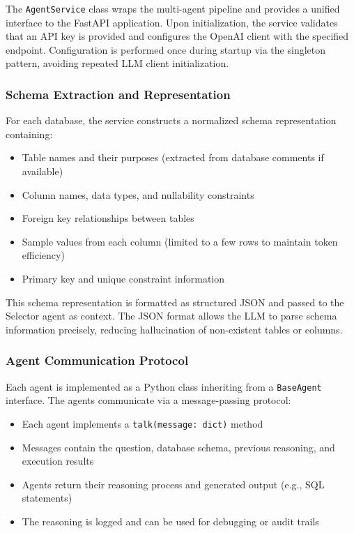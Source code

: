 The \texttt{AgentService} class wraps the multi-agent pipeline and provides a unified interface to the FastAPI application. Upon initialization, the service validates that an API key is provided and configures the OpenAI client with the specified endpoint. Configuration is performed once during startup via the singleton pattern, avoiding repeated LLM client initialization.

\subsubsection{Schema Extraction and Representation}

For each database, the service constructs a normalized schema representation containing:

\begin{itemize}
    \item Table names and their purposes (extracted from database comments if available)
    \item Column names, data types, and nullability constraints
    \item Foreign key relationships between tables
    \item Sample values from each column (limited to a few rows to maintain token efficiency)
    \item Primary key and unique constraint information
\end{itemize}

This schema representation is formatted as structured JSON and passed to the Selector agent as context. The JSON format allows the LLM to parse schema information precisely, reducing hallucination of non-existent tables or columns.

\subsubsection{Agent Communication Protocol}

Each agent is implemented as a Python class inheriting from a \texttt{BaseAgent} interface. The agents communicate via a message-passing protocol:

\begin{itemize}
    \item Each agent implements a \texttt{talk(message: dict)} method
    \item Messages contain the question, database schema, previous reasoning, and execution results
    \item Agents return their reasoning process and generated output (e.g., SQL statements)
    \item The reasoning is logged and can be used for debugging or audit trails
\end{itemize}

